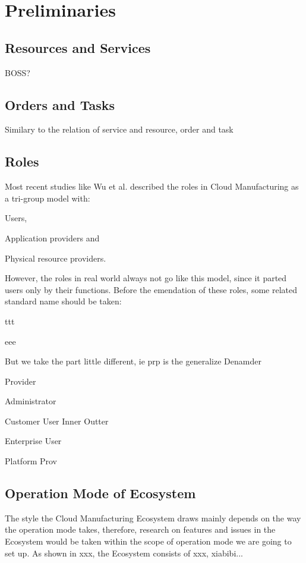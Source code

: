 \section{Preliminaries} %
\subsection{Resources and Services}

BOSS?

\subsection{Orders and Tasks}
Similary to the relation of service and resource, order and task 

\subsection{Roles}
Most recent studies like Wu et al.\cite{Wu2013} described the roles in Cloud Manufacturing as a tri-group model with:\begin{inparaenum}[1)]
\item Users,
\item Application providers and
\item Physical resource providers.
\end{inparaenum}
However, the roles in real world always not go like this model, since it parted users only by their functions. Before the emendation of these roles, some related standard name should be taken:
\begin{description}
\item[] ttt
\item eee
\end{description}

But we take the part little different, ie prp is the generalize
Denamder

Provider

Administrator

Customer User
	Inner
	Outter

Enterprise User

Platform Prov

\subsection{Operation Mode of Ecosystem}
The style the Cloud Manufacturing Ecosystem draws mainly depends on the way the operation mode takes, therefore, research on features and issues in the Ecosystem would be taken within the scope of operation mode we are going to set up. As shown in xxx, the Ecosystem consists of xxx,  xiabibi...

